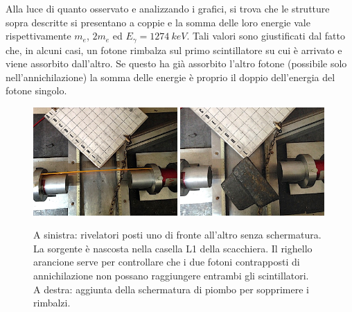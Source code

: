Alla luce di quanto osservato e analizzando i grafici, si trova che le strutture sopra descritte si presentano a coppie e la somma delle loro energie vale rispettivamente $m_e$, $2m_e$ ed $E_{\gamma}=\SI{1274}{keV}$.
Tali valori sono giustificati dal fatto che, in alcuni casi, un fotone rimbalza sul primo scintillatore su cui è arrivato e viene assorbito dall'altro. Se questo ha già assorbito l'altro fotone (possibile solo nell'annichilazione) la somma delle energie è proprio il doppio dell'energia del fotone singolo.

\begin{figure}[h]
\centering
\subfloat
{\includegraphics[width=0.49\textwidth]{immagini/alter}}
\hfill
\subfloat
{\includegraphics[width=0.49\textwidth]{immagini/spostati2}}
\caption{
A sinistra:
rivelatori posti uno di fronte all'altro senza schermatura.
La sorgente è nascosta nella casella L1 della scacchiera.
Il righello arancione serve per controllare che i due fotoni contrapposti di annichilazione
non possano raggiungere entrambi gli scintillatori.\\
A destra: aggiunta della schermatura di piombo per sopprimere i rimbalzi.}
\label{spostati}
\end{figure}

